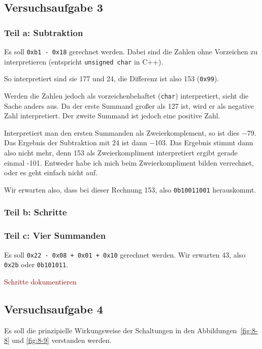 \subsection{Versuchsaufgabe 3}

\subsubsection{Teil a: Subtraktion}

Es soll \texttt{0xb1 - 0x18} gerechnet werden. Dabei sind die Zahlen ohne
Vorzeichen zu interpretieren (entspricht \texttt{unsigned char} in C++).

So interpretiert sind sie 177 und 24, die Differenz ist also 153
(\texttt{0x99}).

Werden die Zahlen jedoch als vorzeichenbehaftet (\texttt{char}) interpretiert,
sieht die Sache anders aus. Da der erste Summand großer als 127 ist, wird er
als negative Zahl interpretiert. Der zweite Summand ist jedoch eine positive
Zahl.

Interpretiert man den ersten Summanden als Zweierkomplement, so ist dies
\num{-79}. Das Ergebnis der Subtraktion mit 24 ist dann \num{-103}. Das
Ergebnis stimmt dann also nicht mehr, denn 153 als Zweierkompliment
interpretiert ergibt gerade einmal -101. Entweder habe ich mich beim
Zweierkompliment bilden verrechnet, oder es geht einfach nicht auf.

Wir erwarten also, dass bei dieser Rechnung 153, also \texttt{0b10011001}
herauskommt.

\subsubsection{Teil b: Schritte}

\fehlt

\subsubsection{Teil c: Vier Summanden}

Es soll \texttt{0x22 - 0x08 + 0x01 + 0x10} gerechnet werden. Wir erwarten 43,
also \texttt{0x2b} oder \texttt{0b101011}.

\textcolor{darkred}{Schritte dokumentieren}

\subsection{Versuchsaufgabe 4}

Es soll die prinzipielle Wirkungsweise der Schaltungen in den
Abbildungen~\ref{fig:8-8} und \ref{fig:8-9} verstanden werden.

